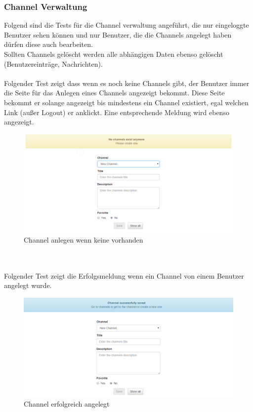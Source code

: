 \documentclass[11pt, a4paper, twoside]{article}   	%
\begin{document}
\subsubsection{Channel Verwaltung}
Folgend sind die Tests für die Channel verwaltung angeführt, die nur eingeloggte Benutzer sehen können und nur Benutzer, die die Channels angelegt haben dürfen diese auch bearbeiten.\\
Sollten Channels gelöscht werden alle abhängigen Daten ebenso gelöscht (Benutzereinträge, Nachrichten).\\\\
Folgender Test zeigt dass wenn es noch keine Channels gibt, der Benutzer immer die Seite für das Anlegen eines Channels angezeigt bekommt. Diese Seite bekommt er solange angezeigt bis mindestens ein Channel existiert, egal welchen Link (außer Logout) er anklickt. Eine entsprechende Meldung wird ebenso angezeigt.
\begin{figure}[h]
	\centering
	\includegraphics[scale=0.5]{images/start_new_channel_no_channels.PNG}
	\caption
	{Channel anlegen wenn keine vorhanden}
\end{figure}\\\\

Folgender Test zeigt die Erfolgsmeldung wenn ein Channel von einem Benutzer angelegt wurde.
\begin{figure}[h]
	\centering
	\includegraphics[scale=0.5]{images/start_new_channel_successful.PNG}
	\caption
	{Channel erfolgreich angelegt}
\end{figure}\\\\
\newpage
\end{document}
